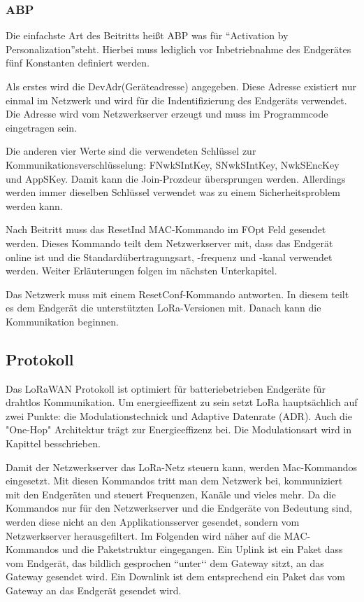 \documentclass[a4paper,12pt]{article}
\begin{document}
            \subsubsection{ABP}
                Die einfachste Art des Beitritts heißt ABP was für ``Activation by Personalization''steht. 
                Hierbei muss lediglich vor Inbetriebnahme des 
                Endgerätes fünf Konstanten definiert werden. 

                Als erstes wird die DevAdr(Geräteadresse) angegeben. Diese Adresse existiert nur einmal im 
                Netzwerk und wird für die Indentifizierung des Endgeräts verwendet. Die Adresse wird vom Netzwerkserver 
                erzeugt und muss im Programmcode eingetragen sein.

                Die anderen vier Werte sind die verwendeten Schlüssel zur Kommunikationsverschlüsselung:  
                FNwkSIntKey, SNwkSIntKey, NwkSEncKey und AppSKey. Damit kann die Join-Prozdeur 
                übersprungen werden. Allerdings werden immer dieselben Schlüssel verwendet was zu einem 
                Sicherheitsproblem werden kann.

                Nach Beitritt muss das ResetInd MAC-Kommando im FOpt Feld gesendet werden. Dieses Kommando 
                teilt dem Netzwerkserver mit, dass das Endgerät online ist und die Standardübertragungsart, 
                -frequenz und -kanal verwendet werden. Weiter Erläuterungen folgen im nächsten Unterkapitel.

                Das Netzwerk muss  mit einem ResetConf-Kommando antworten. In diesem teilt es dem Endgerät die
                unterstützten LoRa-Versionen mit. Danach kann die Kommunikation beginnen.
        \subsection{Protokoll} \label{sec:protokoll}
            Das LoRaWAN Protokoll ist optimiert für batteriebetrieben Endgeräte für drahtlos Kommunikation. 
            Um energieeffizent zu sein setzt LoRa hauptsächlich auf zwei Punkte: die Modulationstechnick und  
            Adaptive Datenrate (ADR). Auch die 
            "One-Hop" Architektur trägt zur Energieeffizenz bei. Die Modulationsart wird in Kapittel 
             besschrieben. \cite[S,1 f]{LoraClasses}


            Damit der Netzwerkserver das LoRa-Netz steuern kann, werden Mac-Kommandos eingesetzt. Mit diesen 
            Kommandos tritt man dem Netzwerk bei, kommuniziert mit den Endgeräten und steuert
            Frequenzen, Kanäle und vieles mehr.
            Da die Kommandos nur für den Netzwerkserver und die Endgeräte von Bedeutung sind, werden diese nicht an 
            den Applikationsserver gesendet, sondern vom Netzwerkserver herausgefiltert. Im Folgenden wird näher auf 
            die MAC-Kommandos und die Paketstruktur eingegangen.
            Ein Uplink ist ein Paket dass vom Endgerät, das bildlich gesprochen ``unter‘‘ dem Gateway sitzt, an das 
            Gateway gesendet wird. Ein Downlink ist dem entsprechend ein Paket das vom Gateway an das Endgerät gesendet 
            wird.
\end{document}
